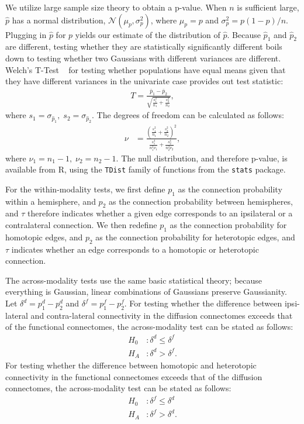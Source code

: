 \documentclass[11pt]{article}
\begin{document}
We utilize large sample size theory to obtain a p-value.
When $n$ is sufficient large, $\hat{p}$ has a normal distribution, $\mathcal{N}(\mu_p,\sigma_p^2)$, where $\mu_p=p$ and $\sigma_p^2=p(1-p) / n$.  Plugging in $\hat{p}$ for $p$ yields our estimate of the distribution of $\hat{p}$.     
Because $\hat{p}_1$ and $\hat{p}_2$ are different, testing whether they are statistically significantly different boils down to testing whether two Gaussians with different variances are different.
Welch's T-Test ~\cite{welch47} for testing whether populations have equal means given that they have different variances in the univariate case provides out test statistic:
\begin{align*}
    T = \frac{\bar{p}_1 - \bar{p}_2}{\sqrt{\frac{s_1^2}{n_1} + \frac{s_2^2}{n_2}}},
\end{align*}
\noindent
where $s_1 = \sigma_{\hat{p}_1},\;s_2 = \sigma_{\hat{p}_2}$. 
The degrees of freedom can be calculated as follows:
\begin{align*}
    \nu &= \frac{\left(\frac{s_1^2}{n_1} + \frac{s_2^2}{n_2}\right)^2}{\frac{s_1^4}{n_1^2 \nu_1} + \frac{s_2^4}{n_2^2\nu_2}},
\end{align*}
\noindent
where $\nu_1 = n_1 - 1, \; \nu_2 = n_2 - 1$.
The null distribution, and therefore p-value, is available from R, using the \texttt{TDist} family of functions from the \texttt{stats} package.

For the within-modality tests, we first define $p_1$ as the connection probability within a hemisphere, and $p_2$ as the connection probability between hemispheres, and $\tau$ therefore indicates whether a given edge corresponds to an ipsilateral or a contralateral connection.  We then redefine $p_1$ as the connection probability for homotopic edges, and $p_2$ as the connection probability for heterotopic edges, and $\tau$ indicates whether an edge corresponds to a homotopic or heterotopic connection.  

The across-modality tests use the same basic statistical theory; because everything is Gaussian, linear combinations of Gaussians preserve Gaussianity.  Let $\delta^d = p^d_1-p^d_2$ and $\delta^f=p^f_1-p^f_2$. For testing whether the difference between ipsi-lateral and contra-lateral connectivity in the diffusion connectomes exceeds that of the functional connectomes, the across-modality test can be stated as follows:
\begin{align*}
        H_0&: \delta^d \leq \delta^f \\
        H_A&: \delta^d > \delta^f.
\end{align*}
For testing whether the difference between homotopic and heterotopic connectivity in the functional connectomes exceeds that of the diffusion connectomes, the across-modality test can be stated as follows:
\begin{align*}
        H_0&: \delta^f \leq \delta^d \\
        H_A&: \delta^f > \delta^d.
\end{align*}
\end{document}
